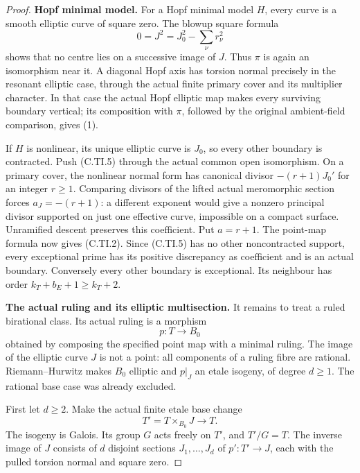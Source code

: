 \begin{proof}
\par\medskip\noindent\textbf{Hopf minimal model.}
For a Hopf minimal model \(H\), every curve
is a smooth elliptic curve of square zero.
The blowup square formula
\[
                  0=J^2=J_0^2-\sum_\nu r_\nu^2
 \tag{C.TI.8}
\]
shows that no centre lies on a successive
image of \(J\). Thus \(\pi\) is again an
isomorphism near it. A diagonal Hopf axis
has torsion normal precisely in the resonant
elliptic case, through the actual finite
primary cover and its multiplier character.
In that case the actual Hopf elliptic map
makes every surviving boundary vertical;
its composition with \(\pi\), followed by
the original ambient-field comparison,
gives (1).

If \(H\) is nonlinear, its unique elliptic
curve is \(J_0\), so every other boundary
is contracted. Push (C.TI.5) through the
actual common open isomorphism. On a
primary cover, the nonlinear normal form
has canonical divisor \(-(r+1)J_0'\) for
an integer \(r\ge1\). Comparing divisors
of the lifted actual meromorphic section
forces \(a_J=-(r+1)\): a different exponent
would give a nonzero principal divisor
supported on just one effective curve,
impossible on a compact surface. Unramified
descent preserves this coefficient. Put
\(a=r+1\). The point-map formula now gives
(C.TI.2). Since (C.TI.5) has no other
noncontracted support, every exceptional
prime has its positive discrepancy as
coefficient and is an actual boundary.
Conversely every other boundary is
exceptional. Its neighbour has order
\(k_T+b_E+1\ge k_T+2\).

\par\medskip\noindent\textbf{The actual ruling and its elliptic multisection.}
It remains to treat a ruled birational
class. Its actual ruling is a morphism
\[
                       p:T\longrightarrow B_0
 \tag{C.TI.9}
\]
obtained by composing the specified point
map with a minimal ruling. The image of
the elliptic curve \(J\) is not a point:
all components of a ruling fibre are
rational. Riemann--Hurwitz makes \(B_0\)
elliptic and \(p|_J\) an etale isogeny,
of degree \(d\ge1\). The rational base
case was already excluded.

First let \(d\ge2\). Make the actual
finite etale base change
\[
 T'=T\times_{B_0}J\longrightarrow T.
 \tag{C.TI.10}
\]
The isogeny is Galois. Its group \(G\)
acts freely on \(T'\), and \(T'/G=T\).
The inverse image of \(J\) consists of
\(d\) disjoint sections \(J_1,\ldots,J_d\)
of \(p':T'\to J\), each with the pulled
torsion normal and square zero.


\end{proof}
